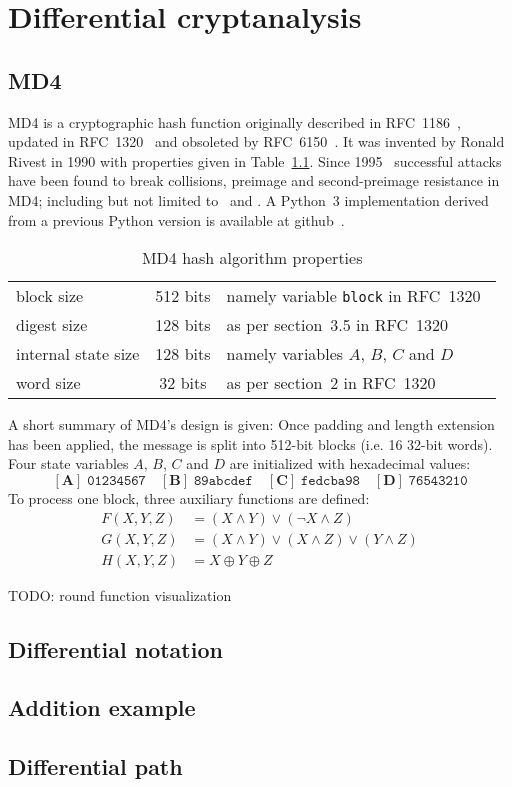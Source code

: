 \renewcommand*\chappic{diff-crypt.pdf_tex}
\chapter{Differential cryptanalysis}
\label{ch:diff-crypt}
%
\section{MD4}
\label{ch:md4}
%
MD4 is a cryptographic hash function originally described in RFC~1186~\cite{rfc1186},
updated in RFC~1320~\cite{rfc1320} and obsoleted by RFC~6150~\cite{rfc6150}. It was
invented by Ronald Rivest in 1990 with properties given in Table~\ref{tab:md4}.
Since 1995~\cite{Dobbertin1998} successful attacks have been found to break collisions,
preimage and second-preimage resistance in MD4; including but not limited to~\cite{md4-2007} and
\cite{cryptoeprint:2005:151}. A Python~3 implementation derived from a previous Python version
is available at github~\cite{md4-py3k}.

\begin{table}[h]
  \begin{center}
    \begin{tabular}{lcl}
      block size           & 512 bits       & namely variable \texttt{block} in RFC~1320~\cite{rfc1320} \\
      digest size          & 128 bits       & as per section~3.5 in RFC~1320~\cite{rfc1320} \\
      internal state size  & 128 bits       & namely variables $A$, $B$, $C$ and $D$ \\
      word size            & 32 bits        & as per section~2 in RFC~1320~\cite{rfc1320} \\
    \end{tabular}
    \caption{MD4 hash algorithm properties}
    \label{tab:md4}
  \end{center}
\end{table}

A short summary of MD4's design is given:
Once padding and length extension has been applied, the message is split into 512-bit blocks
(i.e. 16 32-bit words). Four state variables $A$, $B$, $C$ and $D$ are initialized
with hexadecimal values:
\[
  \mathbf{[A]}\; \mathtt{01234567} \quad
  \mathbf{[B]}\; \mathtt{89abcdef} \quad
  \mathbf{[C]}\; \mathtt{fedcba98} \quad
  \mathbf{[D]}\; \mathtt{76543210}
\]
To process one block, three auxiliary functions are defined:
\begin{align}
  F(X,Y,Z) &= (X \land Y) \lor (\neg X \land Z) \\
  G(X,Y,Z) &= (X \land Y) \lor (X \land Z) \lor (Y \land Z) \\
  H(X,Y,Z) &= X \oplus Y \oplus Z
\end{align}

TODO: round function visualization

\section{Differential notation}
\section{Addition example}
\section{Differential path}
